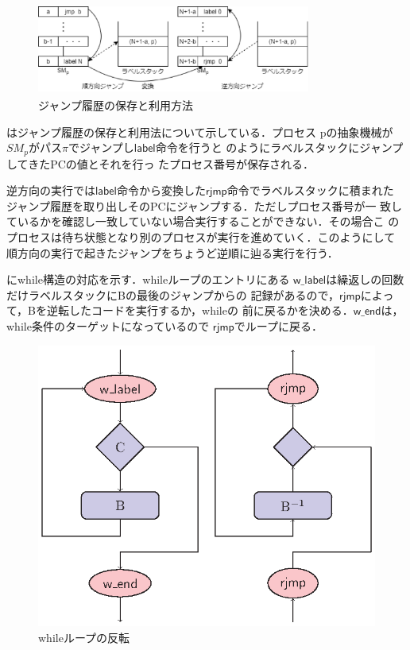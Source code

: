 \documentclass[submit,PRO]{ipsj}
\newcommand{\bcode}[1]{$\mathsf{#1}$}
\begin{document}
\begin{figure}[tb]
\includegraphics[height=3.0cm,width=9.0cm]{jmp.eps}
\caption{ジャンプ履歴の保存と利用方法}
\label{fig:jmp}
\end{figure}

はジャンプ履歴の保存と利用法について示している．プロセス
pの抽象機械が$SM_p$がパス$\pi$でジャンプし\bcode{label}命令を行うと
のようにラベルスタックにジャンプしてきたPCの値とそれを行っ
たプロセス番号が保存される．

逆方向の実行では\bcode{label}命令から変換した\bcode{rjmp}命令でラベルスタックに積まれた
ジャンプ履歴を取り出しそのPCにジャンプする．ただしプロセス番号が一
致しているかを確認し一致していない場合実行することができない．その場合こ
のプロセスは待ち状態となり別のプロセスが実行を進めていく．このようにして
順方向の実行で起きたジャンプをちょうど逆順に辿る実行を行う．

にwhile構造の対応を示す．whileループのエントリにある
\bcode{w\_label}は繰返しの回数だけラベルスタックにBの最後のジャンプからの
記録があるので，\bcode{rjmp}によって，Bを逆転したコードを実行するか，whileの
前に戻るかを決める．\bcode{w\_end}は，while条件のターゲットになっているので
\bcode{rjmp}でループに戻る．

\begin{figure}[tb]
\includegraphics[width=.75\linewidth]{./while-flow.eps}
\caption{whileループの反転}
\label{fig:whileFlow}
\end{figure}
\end{document}
